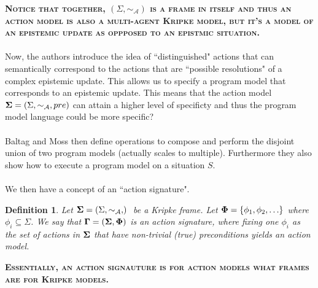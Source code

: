 \documentclass[10pt, a4paper, twoside]{article}
\newcommand{\aRel}[1] {
  \sim_{\mathcal{#1} }
}
\newcommand{\kripkeFrame}[2] {
  (#1, \aRel{#2})
}
\newcommand{\actModel}[3]{
  (#1, \aRel{#2}, #3)
}
\newcommand{\frActModel}[2] { %
  (#1, #2)
}
\newcommand{\note}[1]{\textsc{\textbf{#1}}}
\newtheorem{defn}{Definition}
\begin{document}
\note{Notice that together, $\kripkeFrame{\Sigma}{A}$ is a frame in
itself and thus an action model is also a multi-agent Kripke model, but it's a
model of an epistemic update as oppposed to an epistmic situation.}\\
\\
Now, the authors introduce the idea of ``distinguished" actions that can
semantically correspond to the actions that are ``possible resolutions" of a
complex epistemic update.
This allows us to specify a program model that corresponds to an epistemic
update.
This means that the action model ${\bf \Sigma} = \actModel{\Sigma}{A}{pre}$ can
attain a higher level of specificty and thus the program model language could be
more specific?\\
\\
Baltag and Moss then define operations to compose and perform the disjoint union
of two program models (actually scales to multiple).
Furthermore they also show how to execute a program model on a situation $S$.\\
\\
We then have a concept of an ``action signature".
\begin{defn}
Let ${\bf \Sigma} = \actModel{\Sigma}{A}$ be a Kripke frame.
Let ${\bf \Phi} = \{\phi_1, \phi_2, \ldots \}$ where $\phi_i \subseteq \Sigma$.
We say that ${\bf \Gamma} = \frActModel{ {\bf \Sigma} }{ {\bf \Phi} }$ is an action
signature, where fixing one $\phi_i$ as the set of actions in ${\bf \Sigma}$ 
that have non-trivial (true) preconditions yields an action model.
\end{defn}
\note{Essentially, an action signauture is for action models what frames are
for Kripke models.}
\end{document}
